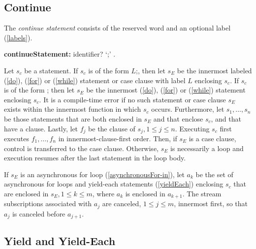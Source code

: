 \documentclass{article}
\newcommand{\code}[1]{{\sf #1}}
\begin{document}
\begin{itemize}
\subsection{ Continue}

\LMHash{}
The {\em continue statement} consists of the reserved word \CONTINUE{} and an optional label (\ref{labels}).

\begin{grammar}
{\bf continueStatement:}
    \CONTINUE{} identifier? `{\escapegrammar ;}'
        .
 \end{grammar}

\LMHash{}
 Let $s_c$ be a \CONTINUE{} statement. If $s_c$ is of the form  \code{\CONTINUE{} $L$;}, then let $s_E$ be the innermost labeled \DO{} (\ref{do}), \FOR{} (\ref{for}) or \WHILE{} (\ref{while}) statement or case clause with label $L$ enclosing $s_c$. If $s_c$ is of the form \code{\CONTINUE{};}  then let $s_E$ be the innermost  \DO{} (\ref{do}), \FOR{} (\ref{for}) or \WHILE{} (\ref{while}) statement enclosing  $s_c$. It is a compile-time error if no such statement or case clause $s_E$ exists within the innermost function in which  $s_c$ occurs.  Furthermore, let $s_1, \ldots, s_n$ be those \TRY{} statements that are both enclosed in $s_E$ and that enclose  $s_c$, and that have a \FINALLY{} clause. Lastly, let $f_j$ be the \FINALLY{} clause of $s_j, 1 \le j \le n$.   Executing  $s_c$ first executes $f_1, \ldots,  f_n$ in innermost-clause-first  order. Then, if $s_E$ is a case clause, control is transferred to the case clause. Otherwise, $s_E$ is necessarily a loop and execution resumes after the last statement in the loop body.


\LMHash{}
 If $s_E$ is an asynchronous for loop (\ref{asynchronousFor-in}), let $a_k$ be the set of asynchronous for loops and yield-each statements (\ref{yieldEach}) enclosing $s_c$ that are enclosed in $s_E , 1 \le k \le m$, where $a_k$ is enclosed in $a_{k+1}$.   The stream subscriptions associated with $a_j$ are canceled, $1 \le j \le m$, innermost first, so that $a_j$ is canceled before $a_{j+1}$.

 \subsection{ Yield and Yield-Each}


\end{itemize}
\end{document}
